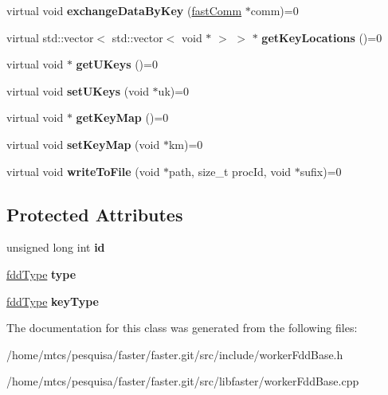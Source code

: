 \begin{DoxyCompactItemize}
virtual void {\bfseries exchange\+Data\+By\+Key} (\hyperlink{classfaster_1_1fastComm}{fast\+Comm} $\ast$comm)=0
\item 
\hypertarget{classfaster_1_1workerFddBase_a7ceebadaee829b6c3c8e247060abc41d}{}\label{classfaster_1_1workerFddBase_a7ceebadaee829b6c3c8e247060abc41d} 
virtual std\+::vector$<$ std\+::vector$<$ void $\ast$ $>$ $>$ $\ast$ {\bfseries get\+Key\+Locations} ()=0
\item 
\hypertarget{classfaster_1_1workerFddBase_acb5a3dfb403da85c6a1826de6cfbe860}{}\label{classfaster_1_1workerFddBase_acb5a3dfb403da85c6a1826de6cfbe860} 
virtual void $\ast$ {\bfseries get\+U\+Keys} ()=0
\item 
\hypertarget{classfaster_1_1workerFddBase_a3e7ddf8ac44303ae2dd321378293a44d}{}\label{classfaster_1_1workerFddBase_a3e7ddf8ac44303ae2dd321378293a44d} 
virtual void {\bfseries set\+U\+Keys} (void $\ast$uk)=0
\item 
\hypertarget{classfaster_1_1workerFddBase_adb066ad6297194ad4f62d7a5237bd849}{}\label{classfaster_1_1workerFddBase_adb066ad6297194ad4f62d7a5237bd849} 
virtual void $\ast$ {\bfseries get\+Key\+Map} ()=0
\item 
\hypertarget{classfaster_1_1workerFddBase_ac9322fecfda8eee0ee17d99c8657fdfb}{}\label{classfaster_1_1workerFddBase_ac9322fecfda8eee0ee17d99c8657fdfb} 
virtual void {\bfseries set\+Key\+Map} (void $\ast$km)=0
\item 
\hypertarget{classfaster_1_1workerFddBase_a2e970acc57e5f55db5aedeaf027b5e24}{}\label{classfaster_1_1workerFddBase_a2e970acc57e5f55db5aedeaf027b5e24} 
virtual void {\bfseries write\+To\+File} (void $\ast$path, size\+\_\+t proc\+Id, void $\ast$sufix)=0
\end{DoxyCompactItemize}
\subsection*{Protected Attributes}
\begin{DoxyCompactItemize}
\item 
\hypertarget{classfaster_1_1workerFddBase_ab131549612a7a269aab35c1920f0e215}{}\label{classfaster_1_1workerFddBase_ab131549612a7a269aab35c1920f0e215} 
unsigned long int {\bfseries id}
\item 
\hypertarget{classfaster_1_1workerFddBase_a220b88e4e5633d9ee7c8c8697a9ff297}{}\label{classfaster_1_1workerFddBase_a220b88e4e5633d9ee7c8c8697a9ff297} 
\hyperlink{namespacefaster_aa8898687bc64536b60a3d5f365060cd6}{fdd\+Type} {\bfseries type}
\item 
\hypertarget{classfaster_1_1workerFddBase_ab5d502564e1c1b12e806033380431afb}{}\label{classfaster_1_1workerFddBase_ab5d502564e1c1b12e806033380431afb} 
\hyperlink{namespacefaster_aa8898687bc64536b60a3d5f365060cd6}{fdd\+Type} {\bfseries key\+Type}
\end{DoxyCompactItemize}


The documentation for this class was generated from the following files\+:\begin{DoxyCompactItemize}
\item 
/home/mtcs/pesquisa/faster/faster.\+git/src/include/worker\+Fdd\+Base.\+h\item 
/home/mtcs/pesquisa/faster/faster.\+git/src/libfaster/worker\+Fdd\+Base.\+cpp\end{DoxyCompactItemize}
